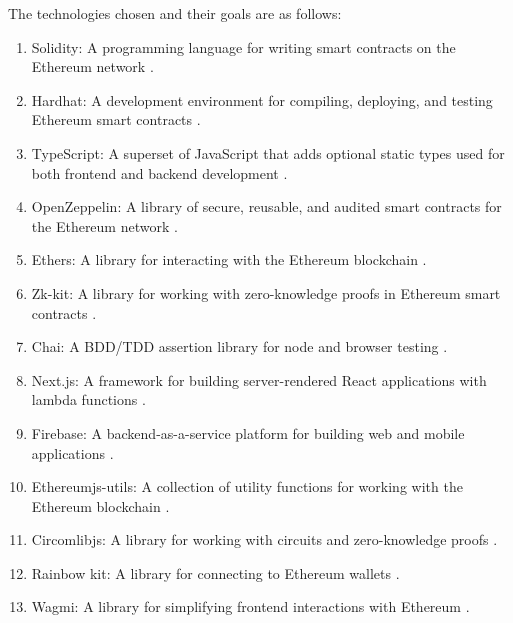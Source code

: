 The technologies chosen and their goals are as follows:
\begin{enumerate}
    \item Solidity: A programming language for writing smart contracts on the Ethereum network \cite{soliditylang}.
    \item Hardhat: A development environment for compiling, deploying, and testing Ethereum smart contracts \cite{hardhat}.
    \item TypeScript: A superset of JavaScript that adds optional static types used for both frontend and backend development \cite{typescript}.
    \item OpenZeppelin: A library of secure, reusable, and audited smart contracts for the Ethereum network \cite{openzeppelin}.
    \item Ethers: A library for interacting with the Ethereum blockchain \cite{ethers}.
    \item Zk-kit: A library for working with zero-knowledge proofs in Ethereum smart contracts \cite{zkkit}.
    \item Chai: A BDD/TDD assertion library for node and browser testing \cite{chaijs}.
    \item Next.js: A framework for building server-rendered React applications with lambda functions \cite{nextjs}.
    \item Firebase: A backend-as-a-service platform for building web and mobile applications \cite{firebase}.
    \item Ethereumjs-utils: A collection of utility functions for working with the Ethereum blockchain \cite{ethereumjs}.
    \item Circomlibjs: A library for working with circuits and zero-knowledge proofs \cite{circomlib}.
    \item Rainbow kit: A library for connecting to Ethereum wallets \cite{rainbow}.
    \item Wagmi: A library for simplifying frontend interactions with Ethereum \cite{wagmi}.
\end{enumerate}

